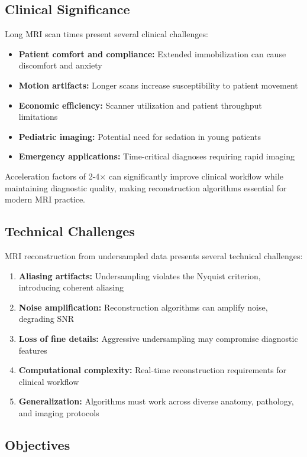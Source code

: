 \documentclass[11pt,a4paper]{article}
\begin{document}
\subsection{Clinical Significance}

Long MRI scan times present several clinical challenges:
\begin{itemize}
    \item \textbf{Patient comfort and compliance:} Extended immobilization can cause discomfort and anxiety
    \item \textbf{Motion artifacts:} Longer scans increase susceptibility to patient movement
    \item \textbf{Economic efficiency:} Scanner utilization and patient throughput limitations
    \item \textbf{Pediatric imaging:} Potential need for sedation in young patients
    \item \textbf{Emergency applications:} Time-critical diagnoses requiring rapid imaging
\end{itemize}

Acceleration factors of 2-4× can significantly improve clinical workflow while maintaining diagnostic quality, making reconstruction algorithms essential for modern MRI practice.

\subsection{Technical Challenges}

MRI reconstruction from undersampled data presents several technical challenges:

\begin{enumerate}
    \item \textbf{Aliasing artifacts:} Undersampling violates the Nyquist criterion, introducing coherent aliasing
    \item \textbf{Noise amplification:} Reconstruction algorithms can amplify noise, degrading SNR
    \item \textbf{Loss of fine details:} Aggressive undersampling may compromise diagnostic features
    \item \textbf{Computational complexity:} Real-time reconstruction requirements for clinical workflow
    \item \textbf{Generalization:} Algorithms must work across diverse anatomy, pathology, and imaging protocols
\end{enumerate}

\subsection{Objectives}
\end{document}
